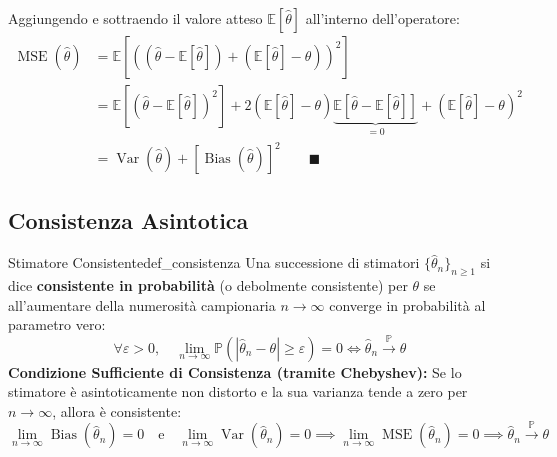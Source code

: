 \begin{dimostrazione}
Aggiungendo e sottraendo il valore atteso $\mathbb{E}[\widehat{\theta}]$ all'interno dell'operatore:
\begin{align}
    \operatorname{MSE}(\widehat{\theta}) &= \mathbb{E}\left[\left( (\widehat{\theta} - \mathbb{E}[\widehat{\theta}]) + (\mathbb{E}[\widehat{\theta}] - \theta) \right)^2\right] \\
    &= \mathbb{E}\left[(\widehat{\theta} - \mathbb{E}[\widehat{\theta}])^2\right] + 2(\mathbb{E}[\widehat{\theta}] - \theta)\underbrace{\mathbb{E}\left[\widehat{\theta} - \mathbb{E}[\widehat{\theta}]\right]}_{=0} + (\mathbb{E}[\widehat{\theta}] - \theta)^2 \\
    &= \operatorname{Var}(\widehat{\theta}) + \left[\operatorname{Bias}(\widehat{\theta})\right]^2 \qquad \blacksquare
\end{align}
\end{dimostrazione}

\subsection{Consistenza Asintotica}

\begin{definizione}{Stimatore Consistente}{def_consistenza}
Una successione di stimatori $\{\widehat{\theta}_n\}_{n \ge 1}$ si dice \textbf{consistente in probabilità} (o debolmente consistente) per $\theta$ se all'aumentare della numerosità campionaria $n \to \infty$ converge in probabilità al parametro vero:
\begin{equation}
    \forall \varepsilon > 0, \quad \lim_{n \to \infty} \mathbb{P}\left(|\widehat{\theta}_n - \theta| \ge \varepsilon\right) = 0 \iff \widehat{\theta}_n \xrightarrow{\mathbb{P}} \theta
\end{equation}
\textbf{Condizione Sufficiente di Consistenza (tramite Chebyshev):} Se lo stimatore è asintoticamente non distorto e la sua varianza tende a zero per $n \to \infty$, allora è consistente:
\begin{equation}
    \lim_{n \to \infty} \operatorname{Bias}(\widehat{\theta}_n) = 0 \quad \text{e} \quad \lim_{n \to \infty} \operatorname{Var}(\widehat{\theta}_n) = 0 \implies \lim_{n \to \infty} \operatorname{MSE}(\widehat{\theta}_n) = 0 \implies \widehat{\theta}_n \xrightarrow{\mathbb{P}} \theta
\end{equation}
\end{definizione}

